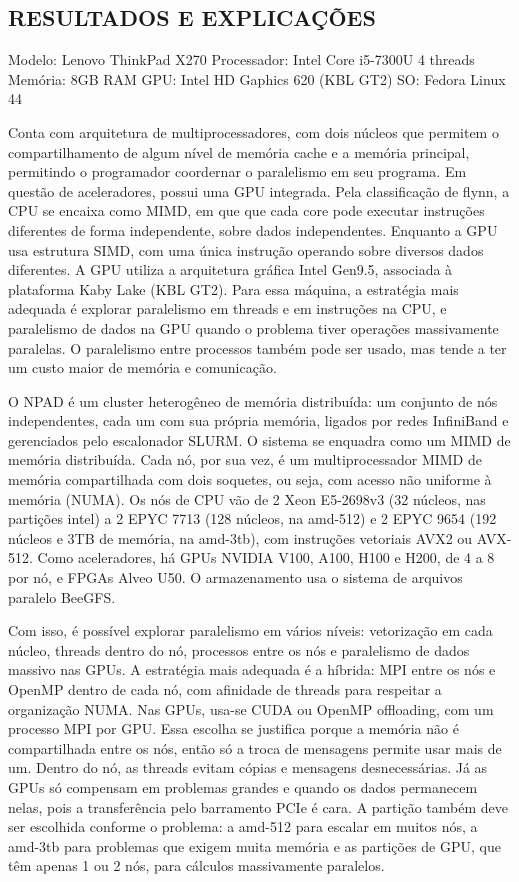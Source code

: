 \documentclass[12pt, openright, oneside, a4paper, brazil]{article}
\newcommand{\subtDois}{RESULTADOS E EXPLICAÇÕES}
\begin{document}
			\subsection{\subtDois}
				\par{Modelo: Lenovo ThinkPad X270
					Processador: Intel Core i5-7300U 4 threads
					Memória: 8GB RAM
					GPU: Intel HD Gaphics 620 (KBL GT2)
					SO: Fedora Linux 44
					
					Conta com arquitetura de multiprocessadores, com dois núcleos que permitem o compartilhamento de algum nível de memória cache e a memória principal, permitindo o programador coordernar o paralelismo em seu programa.
					Em questão de aceleradores, possui uma GPU integrada.
					Pela classificação de flynn, a CPU se encaixa como MIMD, em que que cada core pode executar instruções diferentes de forma independente, sobre dados independentes. Enquanto a GPU usa estrutura SIMD, com uma única instrução operando sobre diversos dados diferentes.
					A GPU utiliza a arquitetura gráfica Intel Gen9.5, associada à plataforma Kaby Lake (KBL GT2).
					Para essa máquina, a estratégia mais adequada é explorar paralelismo em threads e em instruções na CPU, e paralelismo de dados na GPU quando o problema tiver operações massivamente paralelas. O paralelismo entre processos também pode ser usado, mas tende a ter um custo maior de memória e comunicação.
					
					O NPAD é um cluster heterogêneo de memória distribuída: um conjunto de nós independentes, cada um com sua própria memória, ligados por redes InfiniBand e gerenciados pelo escalonador SLURM. O sistema se enquadra como um MIMD de memória distribuída. Cada nó, por sua vez, é um multiprocessador MIMD de memória compartilhada com dois soquetes, ou seja, com acesso não uniforme à memória (NUMA). Os nós de CPU vão de 2 Xeon E5-2698v3 (32 núcleos, nas partições intel) a 2 EPYC 7713 (128 núcleos, na amd-512) e 2 EPYC 9654 (192 núcleos e 3TB de memória, na amd-3tb), com instruções vetoriais AVX2 ou AVX-512. Como aceleradores, há GPUs NVIDIA V100, A100, H100 e H200, de 4 a 8 por nó, e FPGAs Alveo U50. O armazenamento usa o sistema de arquivos paralelo BeeGFS.
					
					Com isso, é possível explorar paralelismo em vários níveis: vetorização em cada núcleo, threads dentro do nó, processos entre os nós e paralelismo de dados massivo nas GPUs. A estratégia mais adequada é a híbrida: MPI entre os nós e OpenMP dentro de cada nó, com afinidade de threads para respeitar a organização NUMA. Nas GPUs, usa-se CUDA ou OpenMP offloading, com um processo MPI por GPU. Essa escolha se justifica porque a memória não é compartilhada entre os nós, então só a troca de mensagens permite usar mais de um. Dentro do nó, as threads evitam cópias e mensagens desnecessárias. Já as GPUs só compensam em problemas grandes e quando os dados permanecem nelas, pois a transferência pelo barramento PCIe é cara. A partição também deve ser escolhida conforme o problema: a amd-512 para escalar em muitos nós, a amd-3tb para problemas que exigem muita memória e as partições de GPU, que têm apenas 1 ou 2 nós, para cálculos massivamente paralelos.}
\end{document}
